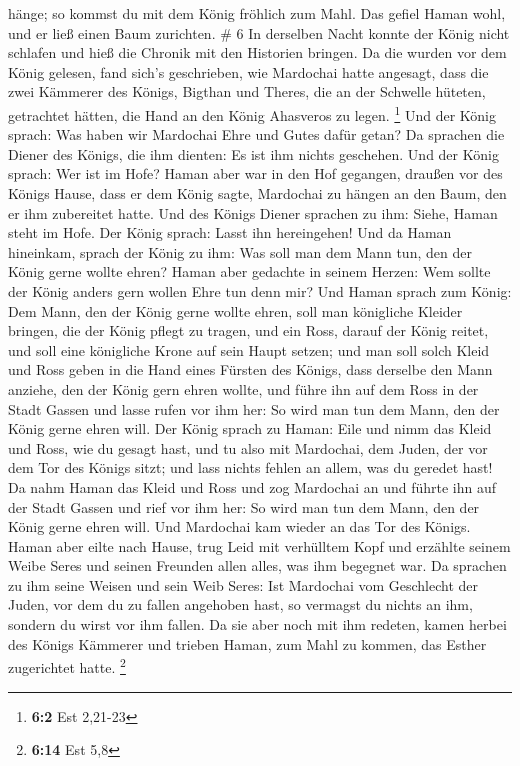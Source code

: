 hänge; so kommst du mit dem König fröhlich zum Mahl. Das gefiel Haman
wohl, und er ließ einen Baum zurichten. \# 6  In derselben
Nacht konnte der König nicht schlafen und hieß die Chronik mit den
Historien bringen. Da die wurden vor dem König gelesen, 
fand sich's geschrieben, wie Mardochai hatte angesagt, dass die zwei
Kämmerer des Königs, Bigthan und Theres, die an der Schwelle hüteten,
getrachtet hätten, die Hand an den König Ahasveros zu legen. \footnote{\textbf{6:2}
  Est 2,21-23}  Und der König sprach: Was haben wir
Mardochai Ehre und Gutes dafür getan? Da sprachen die Diener des Königs,
die ihm dienten: Es ist ihm nichts geschehen.  Und der König
sprach: Wer ist im Hofe? Haman aber war in den Hof gegangen, draußen vor
des Königs Hause, dass er dem König sagte, Mardochai zu hängen an den
Baum, den er ihm zubereitet hatte.  Und des Königs Diener
sprachen zu ihm: Siehe, Haman steht im Hofe. Der König sprach: Lasst ihn
hereingehen!  Und da Haman hineinkam, sprach der König zu
ihm: Was soll man dem Mann tun, den der König gerne wollte ehren? Haman
aber gedachte in seinem Herzen: Wem sollte der König anders gern wollen
Ehre tun denn mir?  Und Haman sprach zum König: Dem Mann,
den der König gerne wollte ehren,  soll man königliche
Kleider bringen, die der König pflegt zu tragen, und ein Ross, darauf
der König reitet, und soll eine königliche Krone auf sein Haupt setzen;
 und man soll solch Kleid und Ross geben in die Hand eines
Fürsten des Königs, dass derselbe den Mann anziehe, den der König gern
ehren wollte, und führe ihn auf dem Ross in der Stadt Gassen und lasse
rufen vor ihm her: So wird man tun dem Mann, den der König gerne ehren
will.  Der König sprach zu Haman: Eile und nimm das Kleid
und Ross, wie du gesagt hast, und tu also mit Mardochai, dem Juden, der
vor dem Tor des Königs sitzt; und lass nichts fehlen an allem, was du
geredet hast!  Da nahm Haman das Kleid und Ross und zog
Mardochai an und führte ihn auf der Stadt Gassen und rief vor ihm her:
So wird man tun dem Mann, den der König gerne ehren will. 
Und Mardochai kam wieder an das Tor des Königs. Haman aber eilte nach
Hause, trug Leid mit verhülltem Kopf  und erzählte seinem
Weibe Seres und seinen Freunden allen alles, was ihm begegnet war. Da
sprachen zu ihm seine Weisen und sein Weib Seres: Ist Mardochai vom
Geschlecht der Juden, vor dem du zu fallen angehoben hast, so vermagst
du nichts an ihm, sondern du wirst vor ihm fallen.  Da sie
aber noch mit ihm redeten, kamen herbei des Königs Kämmerer und trieben
Haman, zum Mahl zu kommen, das Esther zugerichtet hatte. \footnote{\textbf{6:14}
  Est 5,8}

